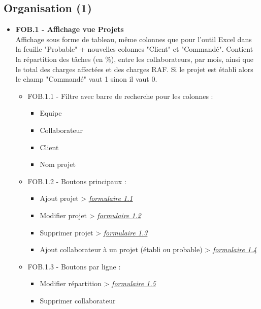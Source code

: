 \documentclass[french]{report}
\begin{document}
\subsection{Organisation (1)}

\begin{itemize}[label=\textbullet, font=\normalfont \color{blue}]
  \item{\textbf{FOB.1 - Affichage vue Projets}}\\
Affichage sous forme de tableau, même colonnes que pour l’outil Excel dans la
feuille "Probable" + nouvelles colonnes "Client" et "Commandé". Contient la
répartition des tâches (en \%), entre les collaborateurs, par mois, ainsi que le
total des charges affectées et des charges RAF. Si le projet est établi alors
le champ "Commandé" vaut 1 sinon il vaut 0.

  \begin{itemize}[label=\textbullet]
    \item{FOB.1.1 - Filtre avec barre de recherche pour les colonnes : }

    \begin{itemize}[label=-]
      \item{Equipe}
      \item{Collaborateur}
      \item{Client}
      \item{Nom projet}
    \end{itemize}

    \item{FOB.1.2 - Boutons principaux : }

    \begin{itemize}[label=-]
      \item{Ajout projet} > \hyperref[sec:1.1]{\emph{formulaire 1.1}}
      \item{Modifier projet} > \hyperref[sec:1.2]{\emph{formulaire 1.2}}
      \item{Supprimer projet} > \hyperref[sec:1.3]{\emph{formulaire 1.3}}
      \item{Ajout collaborateur à un projet (établi ou probable)} > \hyperref[sec:1.4]{\emph{formulaire 1.4}}
    \end{itemize}

    \item{FOB.1.3 - Boutons par ligne : }

    \begin{itemize}[label=-]
      \item{Modifier répartition} > \hyperref[sec:1.5]{\emph{formulaire 1.5}}
      \item{Supprimer collaborateur}
    \end{itemize}


\end{itemize}
\end{itemize}
\end{document}
